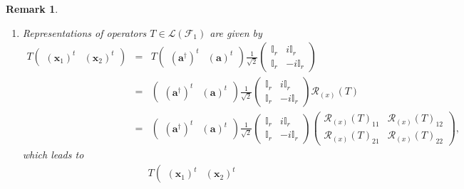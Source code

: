 \documentclass[aps,preprint]{revtex4}
\newtheorem{remark}[theorem]{Remark}
\begin{document}
\begin{remark}
\begin{enumerate}
\begin{enumerate}
\item Representations of operators $T\in \mathcal{L}\left( \mathcal{F}%
_{1}\right) $ are given by 
\begin{eqnarray}
T\left( 
\begin{array}{cc}
\left( \boldsymbol{x}_{1}\right) ^{t} & \left( \boldsymbol{x}_{2}\right) ^{t}%
\end{array}%
\right) &=&T\left( 
\begin{array}{cc}
\left( \boldsymbol{a}^{\dagger }\right) ^{t} & \left( \boldsymbol{a}\right)
^{t}%
\end{array}%
\right) \frac{1}{\sqrt{2}}\left( 
\begin{array}{cc}
\mathbb{I}_{r} & i\mathbb{I}_{r} \\ 
\mathbb{I}_{r} & -i\mathbb{I}_{r}%
\end{array}%
\right) \\
&=&\left( 
\begin{array}{cc}
\left( \boldsymbol{a}^{\dagger }\right) ^{t} & \left( \boldsymbol{a}\right)
^{t}%
\end{array}%
\right) \frac{1}{\sqrt{2}}\left( 
\begin{array}{cc}
\mathbb{I}_{r} & i\mathbb{I}_{r} \\ 
\mathbb{I}_{r} & -i\mathbb{I}_{r}%
\end{array}%
\right) \mathcal{R}_{\left( x\right) }\left( T\right) \\
&=&\left( 
\begin{array}{cc}
\left( \boldsymbol{a}^{\dagger }\right) ^{t} & \left( \boldsymbol{a}\right)
^{t}%
\end{array}%
\right) \frac{1}{\sqrt{2}}\left( 
\begin{array}{cc}
\mathbb{I}_{r} & i\mathbb{I}_{r} \\ 
\mathbb{I}_{r} & -i\mathbb{I}_{r}%
\end{array}%
\right) \left( 
\begin{array}{cc}
\mathcal{R}_{\left( x\right) }\left( T\right) _{11} & \mathcal{R}_{\left(
x\right) }\left( T\right) _{12} \\ 
\mathcal{R}_{\left( x\right) }\left( T\right) _{21} & \mathcal{R}_{\left(
x\right) }\left( T\right) _{22}%
\end{array}%
\right) ,
\end{eqnarray}%
which leads to 
\begin{align}
T\left( 
\begin{array}{cc}
\left( \boldsymbol{x}_{1}\right) ^{t} & \left( \boldsymbol{x}_{2}\right) ^{t}%

\end{array}
\end{align}
\end{enumerate}
\end{enumerate}
\end{remark}
\end{document}
